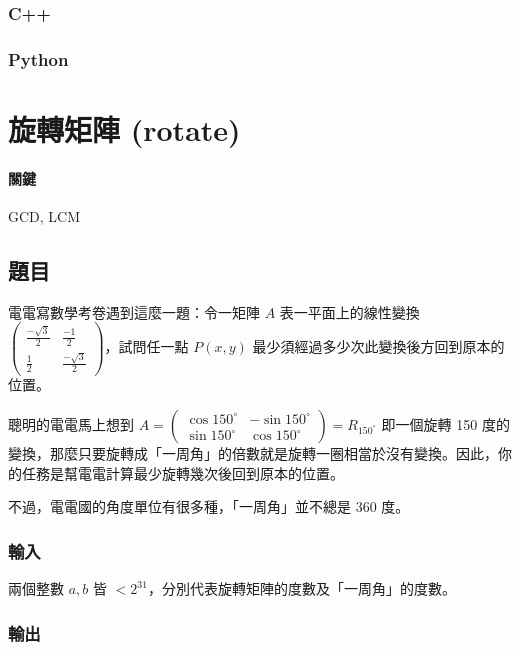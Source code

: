 \documentclass[a4paper,10pt]{article}
\begin{document}
\subsubsection{C++}



\subsubsection{Python}



\section{旋轉矩陣 (rotate)}

\paragraph{關鍵} GCD, LCM

\subsection{題目}

電電寫數學考卷遇到這麼一題：令一矩陣 $A$ 表一平面上的線性變換 $\begin{pmatrix} \frac{-\sqrt{3}}{2} & \frac{-1}{2}\\ \frac{1}{2} & \frac{-\sqrt{3}}{2} \end{pmatrix}$，試問任一點 $P(x, y)$ 最少須經過多少次此變換後方回到原本的位置。

聰明的電電馬上想到 $A = \begin{pmatrix} \cos 150^{\circ} & -\sin 150^{\circ}\\ \sin 150^{\circ} & \cos 150^{\circ} \end{pmatrix} = R_{150^{\circ}}$ 即一個旋轉 150 度的變換，那麼只要旋轉成「一周角」的倍數就是旋轉一圈相當於沒有變換。因此，你的任務是幫電電計算最少旋轉幾次後回到原本的位置。

不過，電電國的角度單位有很多種，「一周角」並不總是 360 度。

\subsubsection{輸入}

兩個整數 $a, b$ 皆 $< 2^{31}$，分別代表旋轉矩陣的度數及「一周角」的度數。

\subsubsection{輸出}
\end{document}
